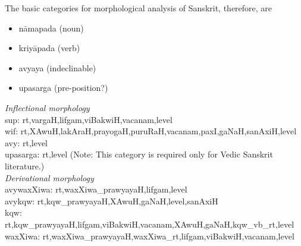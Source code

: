 \documentclass{llncs}
\begin{document}
\noindent 
The basic categories for morphological analysis of Sanskrit, therefore, are 

\begin{itemize}
\item n{\=a}mapada (noun)
\item kriy{\=a}pada (verb)
\item avyaya (indeclinable)
\item upasarga (pre-position?)
\end{itemize}

\noindent 
\textit {Inflectional morphology}\\
sup:  rt,vargaH,lifgam,viBakwiH,vacanam,level \\
wif:  rt,XAwuH,lakAraH,prayogaH,puruRaH,vacanam,paxI,gaNaH,sanAxiH,level \\
avy:  rt,level \\
upasarga:  rt,level (Note: This category is required only for Vedic Sanskrit literature.)\\

\noindent 
\textit {Derivational morphology}\\
avywaxXiwa: rt,waxXiwa\_prawyayaH,lifgam,level \\
avykqw: rt,kqw\_prawyayaH,XAwuH,gaNaH,level,sanAxiH \\
kqw:  rt,kqw\_prawyayaH,lifgam,viBakwiH,vacanam,XAwuH,gaNaH,kqw\_vb\_rt,level\\
waxXiwa: rt,waxXiwa\_prawyayaH,waxXiwa\_rt,lifgam,viBakwiH,vacanam,level\\
\end{document}

